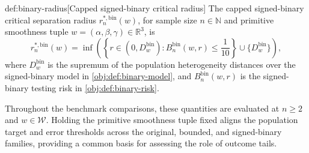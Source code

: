 \begin{definitionv}{def:binary-radius}[Capped signed-binary critical radius]
The capped signed-binary critical separation radius \(r_n^{*,\mathrm{bin}}(w)\), for sample size \(n\in\mathbb N\) and primitive smoothness tuple \(w=(\alpha,\beta,\gamma)\in\mathbb R^3\), is
\[
r_n^{*,\mathrm{bin}}(w)
=
\inf\left(
\left\{r\in(0,D_w^{\mathrm{bin}}):
B_n^{\mathrm{bin}}(w,r)\le \frac{1}{10}\right\}
\cup\{D_w^{\mathrm{bin}}\}
\right),
\]
where \(D_w^{\mathrm{bin}}\) is the supremum of the population heterogeneity distances over the signed-binary model in \cref{obj:def:binary-model}, and \(B_n^{\mathrm{bin}}(w,r)\) is the signed-binary testing risk in \cref{obj:def:binary-risk}.
\end{definitionv}

Throughout the benchmark comparisons, these quantities are evaluated at \(n\ge2\) and \(w\in\mathcal W\). Holding the primitive smoothness tuple fixed aligns the population target and error thresholds across the original, bounded, and signed-binary families, providing a common basis for assessing the role of outcome tails.
